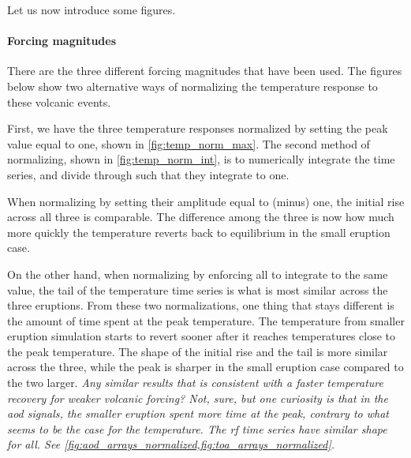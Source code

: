 \documentclass[twocol]{ametsocV5}
\begin{document}
Let us now introduce some figures.

\paragraph{Forcing magnitudes}

There are the three different forcing magnitudes that have been used. The figures below
show two alternative ways of normalizing the temperature response to these volcanic
events.

First, we have the three temperature responses normalized by setting the peak value
equal to one, shown in \cref{fig:temp_norm_max}. The second method of normalizing, shown
in \cref{fig:temp_norm_int}, is to numerically integrate the time series, and divide
through such that they integrate to one.

When normalizing by setting their amplitude equal to (minus) one, the initial rise
across all three is comparable. The difference among the three is now how much more
quickly the temperature reverts back to equilibrium in the small eruption case.

On the other hand, when normalizing by enforcing all to integrate to the same value, the
tail of the temperature time series is what is most similar across the three eruptions.
From these two normalizations, one thing that stays different is the amount of time
spent at the peak temperature. The temperature from smaller eruption simulation starts
to revert sooner after it reaches temperatures close to the peak temperature. The shape
of the initial rise and the tail is more similar across the three, while the peak is
sharper in the small eruption case compared to the two larger. \emph{ Any similar
  results that is consistent with a faster temperature recovery for weaker volcanic
  forcing? Not, sure, but one curiosity is that in the \acrshort{aod} signals, the smaller
  eruption spent more time at the peak, contrary to what seems to be the case for the
  temperature. The \acrshort{rf} time series have similar shape for all. See
  \cref{fig:aod_arrays_normalized,fig:toa_arrays_normalized}.}
\end{document}
